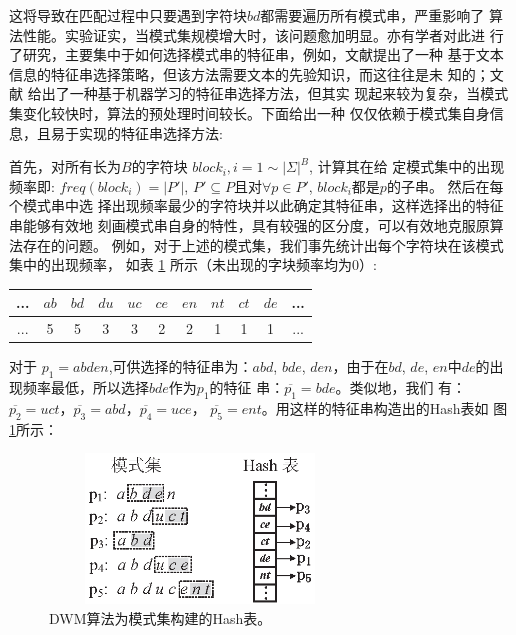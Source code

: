 这将导致在匹配过程中只要遇到字符块$bd$都需要遍历所有模式串，严重影响了
算法性能。实验证实，当模式集规模增大时，该问题愈加明显。亦有学者对此进
行了研究，主要集中于如何选择模式串的特征串，例如，文献\cite{}提出了一种
基于文本信息的特征串选择策略，但该方法需要文本的先验知识，而这往往是未
知的；文献\cite{Tan2011} 给出了一种基于机器学习的特征串选择方法，但其实
现起来较为复杂，当模式集变化较快时，算法的预处理时间较长。下面给出一种
仅仅依赖于模式集自身信息，且易于实现的特征串选择方法:

首先，对所有长为$B$的字符块 $block_i, i=1 \sim |\Sigma|^B$, 计算其在给
定模式集中的出现频率即: $freq(block_i)=|P'|$, $P' \subseteq
P$且对$\forall p \in P'$, $block_i$都是$p$的子串。 然后在每个模式串中选
择出现频率最少的字符块并以此确定其特征串，这样选择出的特征串能够有效地
刻画模式串自身的特性，具有较强的区分度，可以有效地克服原算法存在的问题。
例如，对于上述的模式集，我们事先统计出每个字符块在该模式集中的出现频率，
如表 \ref{tab:block_freq} 所示（未出现的字块频率均为0）:\\


\begin{table}[!htbp]
\centering
\vspace{-8pt}
\begin{tabular}{|c|c|c|c|c|c|c|c|c|c|c|} \hline
  ... & $ab$ & $bd$ & $du$ & $uc$ & $ce$ &  $en$ & $nt$ & $ct$ & $de$ & ... \\\hline
  ... & 5 & 5 & 3 & 3 & 2 & 2 & 1 & 1 & 1 & ... \\
  \hline
  \end{tabular}
  \label{tab:block_freq}
\end{table}


对于 $p_1=abden$,可供选择的特征串为：$abd$, $bde$, $den$，由于在$bd$,
$de$,
$en$中$de$的出现频率最低，所以选择$bde$作为$p_1$的特征
串：$\overline{p_1}=bde$。类似地，我们
有：$\overline{p_2}=uct$，$\overline{p_3}=abd$，$\overline{p_4}=uce$，
$\overline{p_5}=ent$。用这样的特征串构造出的Hash表如
图\ref{fig:WM_hash_table2}所示：

\begin{figure}[!h]
  \centering
  \includegraphics[height=4cm ,width=8cm]{figures/5_WM/hash_table2.eps}
  \caption{DWM算法为模式集构建的Hash表。}
  \label{fig:WM_hash_table2}
\end{figure}

